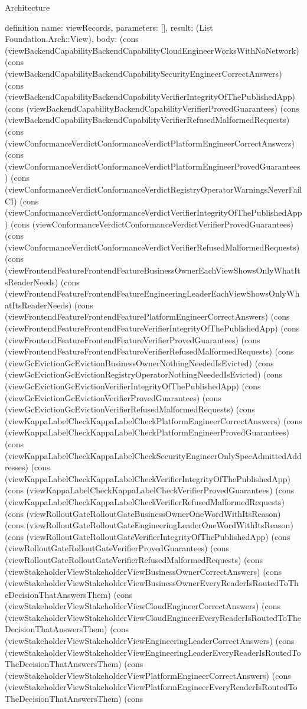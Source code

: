 \begin{lexlean}{Architecture}
\begin{semanticmodule}
definition{
  name: viewRecords,
  parameters: [],
  result: (List Foundation.Arch::View),
  body: (cons (viewBackendCapabilityBackendCapabilityCloudEngineerWorksWithNoNetwork) (cons (viewBackendCapabilityBackendCapabilitySecurityEngineerCorrectAnswers) (cons (viewBackendCapabilityBackendCapabilityVerifierIntegrityOfThePublishedApp) (cons (viewBackendCapabilityBackendCapabilityVerifierProvedGuarantees) (cons (viewBackendCapabilityBackendCapabilityVerifierRefusedMalformedRequests) (cons (viewConformanceVerdictConformanceVerdictPlatformEngineerCorrectAnswers) (cons (viewConformanceVerdictConformanceVerdictPlatformEngineerProvedGuarantees) (cons (viewConformanceVerdictConformanceVerdictRegistryOperatorWarningsNeverFailCI) (cons (viewConformanceVerdictConformanceVerdictVerifierIntegrityOfThePublishedApp) (cons (viewConformanceVerdictConformanceVerdictVerifierProvedGuarantees) (cons (viewConformanceVerdictConformanceVerdictVerifierRefusedMalformedRequests) (cons (viewFrontendFeatureFrontendFeatureBusinessOwnerEachViewShowsOnlyWhatItsReaderNeeds) (cons (viewFrontendFeatureFrontendFeatureEngineeringLeaderEachViewShowsOnlyWhatItsReaderNeeds) (cons (viewFrontendFeatureFrontendFeaturePlatformEngineerCorrectAnswers) (cons (viewFrontendFeatureFrontendFeatureVerifierIntegrityOfThePublishedApp) (cons (viewFrontendFeatureFrontendFeatureVerifierProvedGuarantees) (cons (viewFrontendFeatureFrontendFeatureVerifierRefusedMalformedRequests) (cons (viewGcEvictionGcEvictionBusinessOwnerNothingNeededIsEvicted) (cons (viewGcEvictionGcEvictionRegistryOperatorNothingNeededIsEvicted) (cons (viewGcEvictionGcEvictionVerifierIntegrityOfThePublishedApp) (cons (viewGcEvictionGcEvictionVerifierProvedGuarantees) (cons (viewGcEvictionGcEvictionVerifierRefusedMalformedRequests) (cons (viewKappaLabelCheckKappaLabelCheckPlatformEngineerCorrectAnswers) (cons (viewKappaLabelCheckKappaLabelCheckPlatformEngineerProvedGuarantees) (cons (viewKappaLabelCheckKappaLabelCheckSecurityEngineerOnlySpecAdmittedAddresses) (cons (viewKappaLabelCheckKappaLabelCheckVerifierIntegrityOfThePublishedApp) (cons (viewKappaLabelCheckKappaLabelCheckVerifierProvedGuarantees) (cons (viewKappaLabelCheckKappaLabelCheckVerifierRefusedMalformedRequests) (cons (viewRolloutGateRolloutGateBusinessOwnerOneWordWithItsReason) (cons (viewRolloutGateRolloutGateEngineeringLeaderOneWordWithItsReason) (cons (viewRolloutGateRolloutGateVerifierIntegrityOfThePublishedApp) (cons (viewRolloutGateRolloutGateVerifierProvedGuarantees) (cons (viewRolloutGateRolloutGateVerifierRefusedMalformedRequests) (cons (viewStakeholderViewStakeholderViewBusinessOwnerCorrectAnswers) (cons (viewStakeholderViewStakeholderViewBusinessOwnerEveryReaderIsRoutedToTheDecisionThatAnswersThem) (cons (viewStakeholderViewStakeholderViewCloudEngineerCorrectAnswers) (cons (viewStakeholderViewStakeholderViewCloudEngineerEveryReaderIsRoutedToTheDecisionThatAnswersThem) (cons (viewStakeholderViewStakeholderViewEngineeringLeaderCorrectAnswers) (cons (viewStakeholderViewStakeholderViewEngineeringLeaderEveryReaderIsRoutedToTheDecisionThatAnswersThem) (cons (viewStakeholderViewStakeholderViewPlatformEngineerCorrectAnswers) (cons (viewStakeholderViewStakeholderViewPlatformEngineerEveryReaderIsRoutedToTheDecisionThatAnswersThem) (cons }
\end{semanticmodule}
\end{lexlean}
